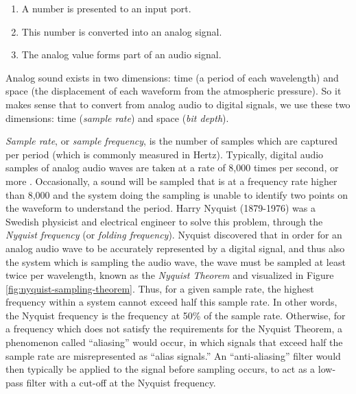 \begin{enumerate}
	\item A number is presented to an input port.
	\item This number is converted into an analog signal.
	\item The analog value forms part of an audio signal.
\end{enumerate}

Analog sound exists in two dimensions: time (a period of each wavelength) and space (the displacement of each waveform from the atmospheric pressure). So it makes sense that to convert from analog audio to digital signals, we use these two dimensions: time (\textit{sample rate}) and space (\textit{bit depth}). 

\textit{Sample rate}, or \textit{sample frequency}, is the number of samples which are captured per period (which is commonly measured in Hertz). Typically, digital audio samples of analog audio waves are taken at a rate of 8,000 times per second, or more \cite{Zjalic_2021}. Occasionally, a sound will be sampled that is at a frequency rate higher than 8,000 and the system doing the sampling is unable to identify two points on the waveform to understand the period. Harry Nyquist (1879-1976) was a Swedish physicist and electrical engineer to solve this problem, through the \textit{Nyquist frequency} (or \textit{folding frequency}). Nyquist discovered that in order for an analog audio wave to be accurately represented by a digital signal, and thus also the system which is sampling the audio wave, the wave must be sampled at least twice per wavelength, known as the \textit{Nyquist Theorem} \cite{Zjalic_2021} and visualized in Figure \ref{fig:nyquist-sampling-theorem}. Thus, for a given sample rate, the highest frequency within a system cannot exceed half this sample rate. In other words, the Nyquist frequency is the frequency at 50\% of the sample rate. Otherwise, for a frequency which does not satisfy the requirements for the Nyquist Theorem, a phenomenon called ``aliasing'' would occur, in which signals that exceed half the sample rate are misrepresented as ``alias signals.'' An ``anti-aliasing'' filter would then typically be applied to the signal before sampling occurs, to act as a low-pass filter with a cut-off at the Nyquist frequency.

